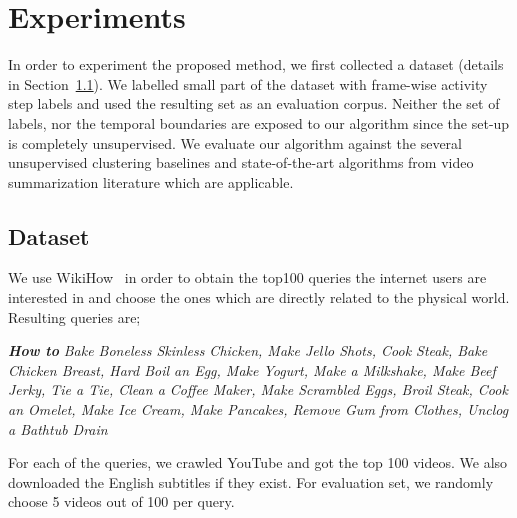 

\section{Experiments}
In order to experiment the proposed method, we first collected a dataset (details in Section~\ref{dataset:sec}). We labelled small part of the dataset with frame-wise activity step labels and used the resulting set as an evaluation corpus. Neither the set of labels, nor the temporal boundaries are exposed to our algorithm since the set-up is completely unsupervised. We evaluate our algorithm against the several unsupervised clustering baselines and state-of-the-art algorithms from video summarization literature which are applicable.
\subsection{Dataset}
\label{dataset:sec}
We use WikiHow~\cite{wikiHow} in order to obtain the top100 queries the internet users are interested in and choose the ones which are
directly related to the physical world. Resulting queries are;

\emph{\textbf{How to}}\footnotesize
\emph{Bake Boneless Skinless Chicken, Make Jello Shots, Cook Steak, Bake Chicken Breast, Hard Boil an Egg, Make Yogurt, Make a Milkshake, Make Beef Jerky, Tie a Tie, Clean a Coffee Maker, Make Scrambled Eggs, Broil Steak, Cook an Omelet, Make Ice Cream, Make Pancakes, Remove Gum from Clothes, Unclog a Bathtub Drain}
\normalsize

For each of the queries, we crawled YouTube and got the top 100 videos. We also downloaded the English subtitles if they exist. For evaluation set, we randomly choose 5 videos out of 100 per query.

\vspace{-1mm}
